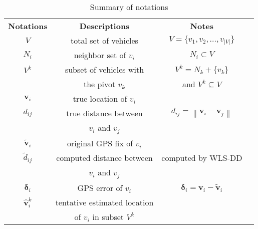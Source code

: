 \documentclass[letterpaper, 10 pt, conference]{ieeeconf}
\begin{document}
\begin {table}\footnotesize
\renewcommand{\arraystretch}{1.4}
\centering \caption{Summary of notations} \label{table:notations}
\begin{tabular}{|l|l|l|l}
\cline{1-3}
\multicolumn{1}{|c|}{\textbf{Notations}} & \multicolumn{1}{c|}{\textbf{Descriptions}} & \multicolumn{1}{c|}{\textbf{Notes}} &  \\
\cline{1-3}
\multicolumn{1}{|c|}{$V$} & \multicolumn{1}{c|}{total set of vehicles} & \multicolumn{1}{c|}{$V = \{ v_1 ,v_2 ,...,v_{\left| V \right|} \}$} &  \\
\cline{1-3}
\multicolumn{1}{|c|}{$N_i$} & \multicolumn{1}{c|}{neighbor set of $v_i$} & \multicolumn{1}{c|}{$N_i \subset V$} &  \\
\cline{1-3}
\multicolumn{1}{|c|}{$V^k$} & \multicolumn{1}{c|}{subset of vehicles with } & \multicolumn{1}{c|}{$V^k=N_k+\{v_k\}$} &  \\
\multicolumn{1}{|c|}{} & \multicolumn{1}{c|}{the pivot $v_k$} & \multicolumn{1}{c|}{and $V^k \subseteq V$} &  \\
\cline{1-3}
\multicolumn{1}{|c|}{$\mathbf{v}_i$} & \multicolumn{1}{c|}{true location of $v_i$} & \multicolumn{1}{c|}{} &  \\
\cline{1-3}
\multicolumn{1}{|c|}{$d_{ij}$} & \multicolumn{1}{c|}{true distance between } & \multicolumn{1}{c|}{$d_{ij}  = \left\| {{\mathbf{v}}_i  - {\mathbf{v}}_j } \right\|$
} &  \\
\multicolumn{1}{|c|}{} & \multicolumn{1}{c|}{$v_i$ and $v_j$} & \multicolumn{1}{c|}{} &  \\
\cline{1-3}
\multicolumn{1}{|c|}{${\mathbf{\tilde v}}_i $} & \multicolumn{1}{c|}{original GPS fix of $v_i$} & \multicolumn{1}{c|}{} &  \\
\cline{1-3}
\multicolumn{1}{|c|}{$\tilde d_{ij} $} & \multicolumn{1}{c|}{computed distance between } & \multicolumn{1}{c|}{computed by WLS-DD} &  \\
\multicolumn{1}{|c|}{} & \multicolumn{1}{c|}{ $v_i$ and $v_j$} & \multicolumn{1}{c|}{} &  \\
\cline{1-3}
\multicolumn{1}{|c|}{${\mathbf{\delta }}_i $} & \multicolumn{1}{c|}{GPS error of $v_i$} & \multicolumn{1}{c|}{${\mathbf{\delta }}_i  = {\mathbf{v}}_i  - {\mathbf{\tilde v}}_i $} &  \\
\cline{1-3}
\multicolumn{1}{|c|}{${\mathbf{\hat v}}_i^k $} & \multicolumn{1}{c|}{tentative estimated location } & \multicolumn{1}{c|}{} &  \\
\multicolumn{1}{|c|}{} & \multicolumn{1}{c|}{of $v_i$ in subset $V^k$} & \multicolumn{1}{c|}{} &  \\

\end{tabular}
\end{table}
\end{document}
